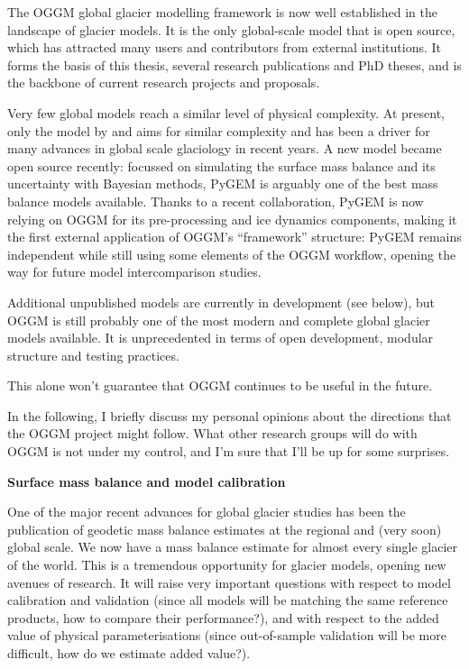 The OGGM global glacier modelling framework is now well established in the landscape of
glacier models. It is the only global-scale model that is open source, which has
attracted many users and contributors from external institutions. It forms the basis of this thesis,
several research publications and PhD theses, and is the backbone of current research projects and
proposals.

Very few global models reach a similar level of physical complexity. At present, only the model by
\citet{Huss2015} and \citet{Zekollari2019}  aims for similar complexity and has
been a driver for many advances in global scale glaciology in recent years. A new model \citep[PyGEM,][]{Rounce2020}
became open source recently: focussed on simulating the surface mass balance and its uncertainty with Bayesian
methods, PyGEM is arguably one of the best mass balance models available. Thanks to a recent collaboration, PyGEM is now
relying on OGGM for its pre-processing and ice dynamics components, making it the first external application
of OGGM’s “framework” structure: PyGEM remains independent while still using some elements
of the OGGM workflow, opening the way for future model intercomparison studies.

Additional unpublished models are currently in development (see below), but OGGM is still probably one of the most
modern and complete global glacier models available. It is unprecedented in terms of open development, modular
structure and testing practices.

This alone won’t guarantee that OGGM continues to be useful in the future.

In the following, I briefly discuss my personal opinions about the directions that the OGGM project might follow.
What other research groups will do with OGGM is not under my control, and I’m sure that I’ll be up for some surprises.

\textbf{Surface mass balance and model calibration}

One of the major recent advances for global glacier studies has been the publication of geodetic mass balance estimates at the
regional and (very soon) global scale. We now have a mass balance estimate for almost every single glacier of the world.
This is a tremendous opportunity for glacier models, opening new avenues of research.
It will raise very important questions with respect to model calibration and validation (since all models will
be matching the same reference products, how to compare their performance?), and with respect to the added value of
physical parameterisations (since out-of-sample validation will be more difficult, how do we estimate added value?).

